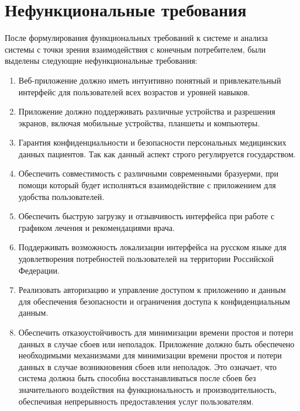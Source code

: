     \section{Нефункциональные требования}

        После формулирования функциональных требований к системе и анализа %
        системы с точки зрения взаимодействия с конечным потребителем, были выделены %
        следующие нефункциональные требования:
        \newline
        \begin{enumerate}
            \item Веб-приложение должно иметь интуитивно понятный и %
            привлекательный интерфейс для пользователей всех возрастов %
            и уровней навыков. 

            \item Приложение должно поддерживать различные устройства и %
            разрешения экранов, включая мобильные устройства, планшеты %
            и компьютеры. 

            \item Гарантия конфиденциальности и безопасности %
            персональных медицинских данных пациентов. Так как данный аспект %
            строго регулируется государством. 

            \item Обеспечить совместимость с различными современными бразуерми, %
            при помощи который будет исполняться взаимодействие с приложением для %
            удобства пользователей.

            \item Обеспечить быструю загрузку и отзывчивость интерфейса %
            при работе с графиком лечения и рекомендациями врача.

            \item Поддерживать возможность локализации интерфейса на %
            русском языке для удовлетворения потребностей пользователей %
            на территории Российской Федерации.

            \item Реализовать авторизацию и управление доступом к %
            приложению и данным для обеспечения безопасности и %
            ограничения доступа к конфиденциальным данным.

            \item Обеспечить отказоустойчивость для минимизации времени %
            простоя и потери данных в случае сбоев или неполадок. %
            Приложение должно быть обеспечено необходимыми механизмами %
            для минимизации времени простоя и потери данных в случае %
            возникновения сбоев или неполадок. Это означает, что %
            система должна быть способна восстанавливаться после %
            сбоев без значительного воздействия на функциональность и производительность, обеспечивая непрерывность предоставления услуг пользователям.
        \end{enumerate}